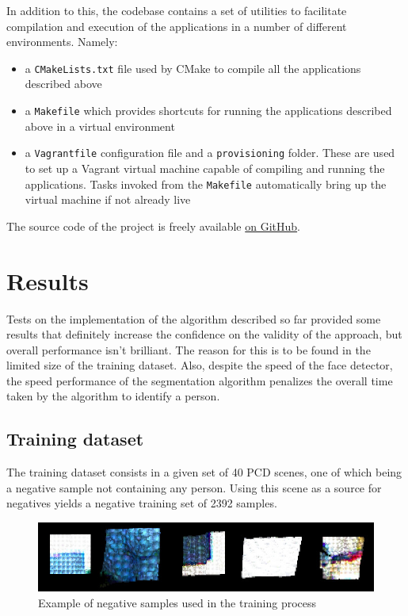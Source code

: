 \documentclass[a4paper,11pt,titlepage]{article}
\begin{document}
In addition to this, the codebase contains a set of utilities to facilitate
compilation and execution of the applications in a number of different
environments. Namely:

\begin{itemize}
  \item a \texttt{CMakeLists.txt} file used by CMake to compile all the
    applications described above
  \item a \texttt{Makefile} which provides shortcuts for running the
    applications described above in a virtual environment
  \item a \texttt{Vagrantfile} configuration file and a \texttt{provisioning}
    folder. These are used to set up a Vagrant virtual machine capable of
    compiling and running the applications. Tasks invoked from the
    \texttt{Makefile} automatically bring up the virtual machine if not already
    live
\end{itemize}

The source code of the project is freely available
\href{https://github.com/stefanozanella/people_detection}{on GitHub}.

\section{Results}
Tests on the implementation of the algorithm described so far provided some results that
definitely increase the confidence on the validity of the approach, but overall
performance isn't brilliant. The reason for this is to be found in the limited
size of the training dataset. Also, despite the speed of the face detector, the
speed performance of the segmentation algorithm penalizes the overall time taken
by the algorithm to identify a person.

\subsection{Training dataset}
The training dataset consists in a given set of 40 PCD scenes, one of which
being a negative sample not containing any person. Using this scene as a source
for negatives yields a negative training set of 2392 samples.

\begin{figure}[h]
  \centering
  \includegraphics[scale=0.8]{negative_samples.jpg}
  \caption{Example of negative samples used in the training process}
  \label{fig:negative_samples}
\end{figure}
\end{document}
